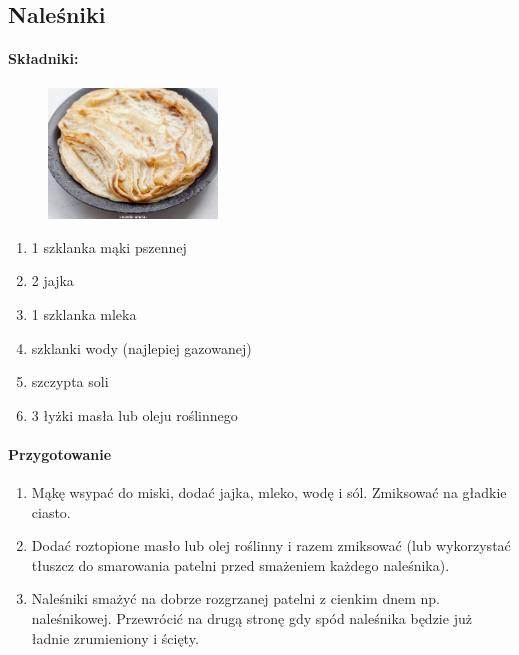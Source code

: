 \documentclass{article}
\begin{document}
    \subsection{Naleśniki}
    \bigskip
    \paragraph{Składniki:}
    \begin{figure}
        \includegraphics[width=0.4\textwidth]{nalesniki.jpg}
    \end{figure}
    \begin{enumerate}
        \item 1 szklanka mąki pszennej
        \item 2 jajka
        \item 1 szklanka mleka
        \item {} szklanki wody (najlepiej gazowanej)
        \item szczypta soli
        \item 3 łyżki masła lub oleju roślinnego
    \end{enumerate}

    \paragraph{Przygotowanie}
    \begin{enumerate}
        \item Mąkę wsypać do miski, dodać jajka, mleko, wodę i sól. Zmiksować na
            gładkie ciasto.
        \item Dodać roztopione masło lub olej roślinny i razem zmiksować (lub
            wykorzystać tłuszcz do smarowania patelni przed smażeniem każdego
            naleśnika).
        \item Naleśniki smażyć na dobrze rozgrzanej patelni z cienkim dnem np.
            naleśnikowej. Przewrócić na drugą stronę gdy spód naleśnika będzie
            już ładnie zrumieniony i ścięty.
    \end{enumerate}
    \newpage
\end{document}
